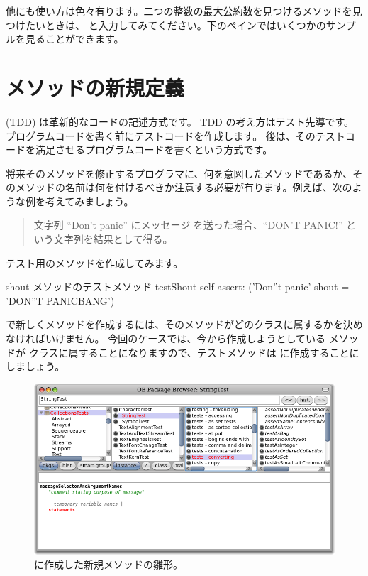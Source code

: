 \documentclass[a4paper,10pt,twoside]{book}
\begin{document}
他にも使い方は色々有ります。二つの整数の最大公約数を見つけるメソッドを見つけたいときは、 と入力してみてください。下のペインではいくつかのサンプルを見ることができます。

\section{メソッドの新規定義}

\cite{Beck03a} (TDD) は革新的なコードの記述方式です。
TDD の考え方はテスト先導です。プログラムコードを書く前にテストコードを作成します。
後は、そのテストコードを満足させるプログラムコードを書くという方式です。

将来そのメソッドを修正するプログラマに、何を意図したメソッドであるか、そのメソッドの名前は何を付けるべきか注意する必要が有ります。例えば、次のような例を考えてみましょう。

\begin{quote}
文字列 ``Don't panic'' にメッセージ  を送った場合、``DON'T PANIC!'' という文字列を結果として得る。
\end{quote}

\noindent
テスト用のメソッドを作成してみます。

\begin{method}[testShout]{shout メソッドのテストメソッド}
testShout
	self assert: ('Don''t panic' shout = 'DON''T PANICBANG')
\end{method} %

\pharo で新しくメソッドを作成するには、そのメソッドがどのクラスに属するかを決めなければいけません。
今回のケースでは、今から作成しようとしている  メソッドが  クラスに属することになりますので、テストメソッドは  に作成することにしましょう。

\begin{figure}[hbt]
\centerline {\includegraphics[width=\textwidth]{StringTest-newMethodTemplate}}
\caption{ に作成した新規メソッドの雛形。
}
\end{figure}
\end{document}
